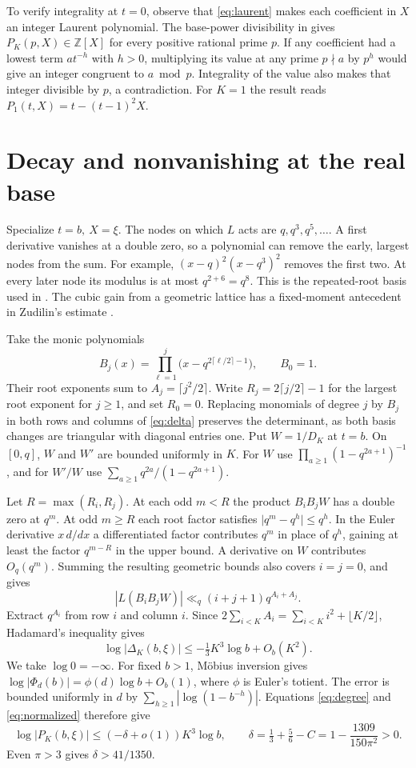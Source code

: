 \documentclass[11pt,letterpaper]{article}
\newcommand{\Z}{\mathbb Z}
\begin{document}
To verify integrality at \(t=0\), observe that \eqref{eq:laurent} makes
each coefficient in \(X\) an integer Laurent polynomial. The base-power
divisibility in \cite[Proposition~3.1 and
(5.2)]{uplift} gives \(P_K(p,X)\in\Z[X]\) for every positive rational
prime \(p\). If any coefficient had a lowest term \(a t^{-h}\) with
\(h>0\), multiplying its value at any prime \(p\nmid a\) by \(p^h\)
would give an integer congruent to \(a\bmod p\). Integrality of the
value also makes that integer divisible by \(p\), a contradiction.
For \(K=1\) the result reads \(P_1(t,X)=t-(t-1)^2X\).

\section{Decay and nonvanishing at the real base}\label{sec:real}
Specialize \(t=b,\ X=\xi\). The nodes on which \(L\) acts are
\(q,q^3,q^5,\ldots\). A first derivative vanishes at a double zero,
so a polynomial can remove the early, largest nodes from the sum.
For example, \((x-q)^2(x-q^3)^2\) removes the first two. At every
later node its modulus is at most \(q^{2+6}=q^8\).
This is the repeated-root basis used in \cite[\S6]{uplift}. The cubic
gain from a geometric lattice has a fixed-moment antecedent in
Zudilin's estimate \cite[\S4, (8)]{zudilin}.

Take the monic polynomials
\[
 B_j(x)=\prod_{\ell=1}^j\big(x-q^{2\lceil\ell/2\rceil-1}\big),\qquad B_0=1.
\]
Their root exponents sum to \(A_j=\lceil j^2/2\rceil\). Write
\(R_j=2\lceil j/2\rceil-1\) for the largest root exponent for \(j\ge1\),
and set \(R_0=0\). Replacing monomials of degree \(j\) by \(B_j\) in
both rows and columns of \eqref{eq:delta} preserves the determinant,
as both basis changes are triangular with diagonal entries one. Put
\(W=1/D_K\) at \(t=b\). On \([0,q]\), \(W\) and \(W'\) are bounded
uniformly in \(K\). For \(W\) use \(\prod_{a\ge1}(1-q^{2a+1})^{-1}\),
and for \(W'/W\) use \(\sum_{a\ge1}q^{2a}/(1-q^{2a+1})\).

Let \(R=\max(R_i,R_j)\). At each odd \(m<R\) the product \(B_i B_j W\)
has a double zero at \(q^m\). At odd \(m\ge R\) each root factor satisfies
\(\lvert q^m-q^h\rvert\le q^h\). In the Euler derivative \(x\,d/dx\)
a differentiated factor contributes \(q^m\) in place of \(q^h\), gaining
at least the factor \(q^{m-R}\) in the upper bound. A derivative on
\(W\) contributes \(O_q(q^m)\). Summing the resulting geometric bounds
also covers \(i=j=0\), and gives
\[
 \left|L(B_iB_jW)\right|\ll_q (i+j+1)q^{A_i+A_j}.
\]
Extract \(q^{A_i}\) from row \(i\) and column \(i\). Since
\(2\sum_{i<K}A_i=\sum_{i<K}i^2+\lfloor K/2\rfloor\), Hadamard's
inequality gives
\[
  \log|\Delta_K(b,\xi)|\le -\tfrac13 K^3\log b+O_b(K^2).
\]
We take \(\log 0=-\infty\). For fixed \(b>1\), Möbius inversion gives
\(\log|\Phi_d(b)|=\phi(d)\log b+O_b(1)\), where \(\phi\) is Euler's
totient. The error is bounded uniformly in \(d\) by
\(\sum_{h\ge1}|\log(1-b^{-h})|\). Equations \eqref{eq:degree} and
\eqref{eq:normalized} therefore give
\begin{equation}\label{eq:small}
 \log|P_K(b,\xi)|\le(-\delta+o(1))K^3\log b,\qquad
 \delta=\tfrac13+\tfrac56-C=1-\frac{1309}{150\pi^2}>0 .
\end{equation}
Even \(\pi>3\) gives \(\delta>41/1350\).
\end{document}
